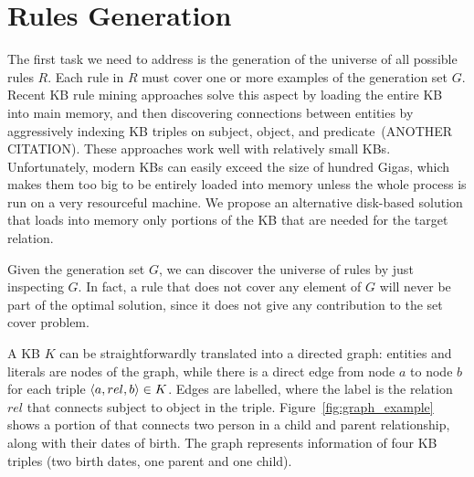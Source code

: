 \section{Rules Generation}
The first task we need to address is the generation of the universe of all possible rules $R$. Each rule in $R$ must cover one or more examples of the generation set $G$.
Recent KB rule mining approaches solve this aspect by loading the entire KB into main memory, and then discovering connections between entities by aggressively indexing KB triples on subject, object, and predicate~\cite{galarraga2015fast}(ANOTHER CITATION). These approaches work well with relatively small KBs. Unfortunately, modern KBs can easily exceed the size of hundred Gigas, which makes them too big to be entirely loaded into memory unless the whole process is run on a very resourceful machine. We propose an alternative disk-based solution that loads into memory only portions of the KB that are needed for the target relation.

Given the generation set $G$, we can discover the universe of rules by just inspecting $G$. In fact, a rule that does not cover any element of $G$ will never be part of the optimal solution, since it does not give any contribution to the set cover problem.

A KB $K$ can be straightforwardly translated into a directed graph: entities and literals are nodes of the graph, while there is a direct edge from node $a$ to node $b$ for each triple $\langle a,rel,b\rangle \in K$. Edges are labelled, where the label is the relation $rel$ that connects subject to object in the triple. Figure~\ref{fig:graph_example} shows a portion of \dbpedia that connects two person in a child and parent relationship, along with their dates of birth. The graph represents information of four KB triples (two birth dates, one parent and one child).

